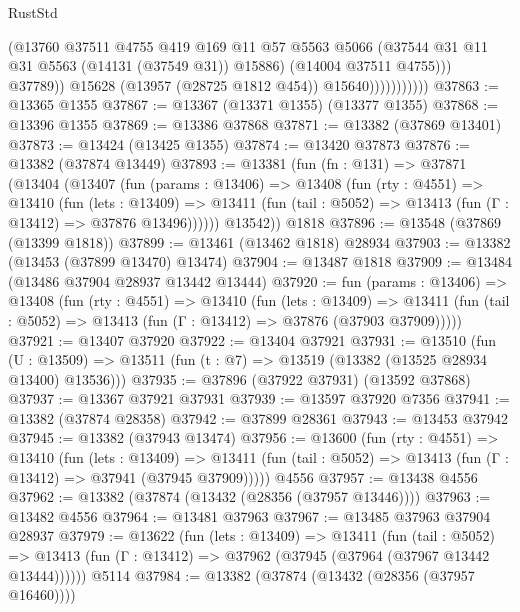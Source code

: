 \begin{lexlean}{RustStd}
\begin{coremodule}
                                (@13760
                                  @37511
                                  @4755
                                  @419
                                  @169
                                  @11
                                  @57
                                  @5563
                                  @5066
                                  (@37544 @31 @11 @31 @5563 (@14131 (@37549 @31)) @15886)
                                  (@14004 @37511 @4755)))
                              @37789))
                          @15628
                          (@13957 (@28725 @1812 @454))
                          @15640)))))))))))
@37863 := @13365 @1355
@37867 := @13367 (@13371 @1355) (@13377 @1355)
@37868 := @13396 @1355
@37869 := @13386 @37868
@37871 := @13382 (@37869 @13401)
@37873 := @13424 (@13425 @1355)
@37874 := @13420 @37873
@37876 := @13382 (@37874 @13449)
@37893 := @13381
    (fun (fn : @131) =>
    @37871
      (@13404
        (@13407
          (fun (params : @13406) =>
          @13408
            (fun (rty : @4551) =>
            @13410
              (fun (lets : @13409) =>
              @13411 (fun (tail : @5052) => @13413 (fun (Γ : @13412) => @37876 @13496))))))
        @13542))
    @1818
@37896 := @13548 (@37869 (@13399 @1818))
@37899 := @13461 (@13462 @1818) @28934
@37903 := @13382 (@13453 (@37899 @13470) @13474)
@37904 := @13487 @1818
@37909 := @13484 (@13486 @37904 @28937 @13442 @13444)
@37920 := fun (params : @13406) =>
  @13408
    (fun (rty : @4551) =>
    @13410
      (fun (lets : @13409) =>
      @13411 (fun (tail : @5052) => @13413 (fun (Γ : @13412) => @37876 (@37903 @37909)))))
@37921 := @13407 @37920
@37922 := @13404 @37921
@37931 := @13510
    (fun (U : @13509) => @13511 (fun (t : @7) => @13519 (@13382 (@13525 @28934 @13400) @13536)))
@37935 := @37896 (@37922 @37931) (@13592 @37868)
@37937 := @13367 @37921 @37931
@37939 := @13597 @37920 @7356
@37941 := @13382 (@37874 @28358)
@37942 := @37899 @28361
@37943 := @13453 @37942
@37945 := @13382 (@37943 @13474)
@37956 := @13600
    (fun (rty : @4551) =>
    @13410
      (fun (lets : @13409) =>
      @13411 (fun (tail : @5052) => @13413 (fun (Γ : @13412) => @37941 (@37945 @37909)))))
    @4556
@37957 := @13438 @4556
@37962 := @13382 (@37874 (@13432 (@28356 (@37957 @13446))))
@37963 := @13482 @4556
@37964 := @13481 @37963
@37967 := @13485 @37963 @37904 @28937
@37979 := @13622
    (fun (lets : @13409) =>
    @13411
      (fun (tail : @5052) =>
      @13413 (fun (Γ : @13412) => @37962 (@37945 (@37964 (@37967 @13442 @13444))))))
    @5114
@37984 := @13382 (@37874 (@13432 (@28356 (@37957 @16460))))

\end{coremodule}
\end{lexlean}
